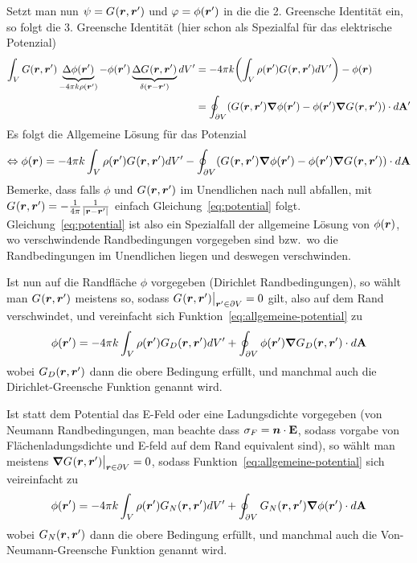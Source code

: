 Setzt man nun $\psi=\green$ und $\varphi=\phi(\vr')$ in die die 2.
Greensche Identität ein, so folgt die 3. Greensche Identität (hier schon
als Spezialfal für das elektrische Potenzial)
\begin{equation}
  \begin{split}
    \int_V G(\vb*r,\vb*r')\underbrace{\Delta\phi(\vb*r')}_{%
    -4\pi k\rho(\vb*r')} 
    - \phi(\vb*r')\underbrace{\Delta \green}_{\delta(\vb*r - \vb*r')}
    dV'
    &= -4\pi k\qty(\int_V \rho(\vb*r') \green dV') -\phi(\vb*r)\\
    &= \oint_{\partial V} (\green\grad\phi(\vr')-\phi(\vr')\grad\green)\ddA'\\
  \end{split}
\end{equation}
Es folgt die Allgemeine Lösung für das Potenzial
\begin{equation}
  \label{eq:allgemeine-potential}
  \Leftrightarrow \phi(\vr) = -4\pi k\int_V \rho(\vr')\green dV' 
  - \oint_{\partial V} (\green\grad\phi(\vr')-\phi(\vr')\grad\green)\ddA
\end{equation}
Bemerke, dass falls $\phi$ und $\green$ im Unendlichen nach null abfallen,
mit $\green=-\frac{1}{4\pi} \frr $ einfach Gleichung~\ref{eq:potential} folgt.
Gleichung~\ref{eq:potential} ist also ein Spezialfall der allgemeine Lösung von $\phi(\vr)$, wo
verschwindende Randbedingungen vorgegeben sind bzw.\ wo die Randbedingungen im Unendlichen liegen und deswegen verschwinden.

Ist nun auf die Randfläche $\phi$ vorgegeben (Dirichlet Randbedingungen), 
so wählt man $\green$ meistens so,
sodass $\green\big|_{\vr'\in\partial V}= 0$ gilt, also auf dem Rand 
verschwindet, und vereinfacht sich Funktion~\ref{eq:allgemeine-potential} zu
\begin{equation}
  \label{eq:dirichlet-green-potential}
  \phi(\vb*r') = -4\pi k\int_V \rho(\vr')\green[D] dV' 
  + \oint_{\partial V} \phi(\vr')\grad\green[D] \ddA
\end{equation}
wobei $\green[D]$ dann die obere Bedingung erfüllt, und manchmal
auch die Dirichlet-Greensche Funktion genannt wird.

Ist statt dem Potential das E-Feld oder eine Ladungsdichte vorgegeben 
(von Neumann Randbedingungen, man beachte dass $\sigma_F=\vb*n\cdot\vb E$,
sodass vorgabe von Flächenladungsdichte und E-feld auf dem Rand equivalent 
sind), so wählt man meistens $\grad\green\big|_{\vr\in\partial V}=0$,
sodass Funktion~\ref{eq:allgemeine-potential} sich veireinfacht zu
\begin{equation}
  \phi(\vb*r') = -4\pi k\int_V \rho(\vr')\green[N] dV' 
  + \oint_{\partial V} \green[N]\grad\phi(\vr') \ddA
\end{equation}
wobei $\green[N]$ dann die obere Bedingung erfüllt, und manchmal
auch die Von-Neumann-Greensche Funktion genannt wird.
\clearpage

